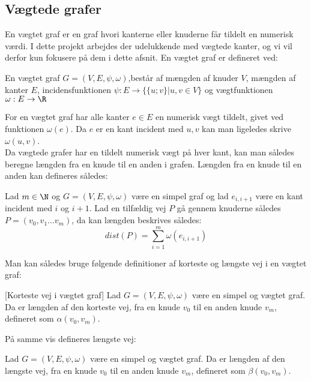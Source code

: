 \subsection{Vægtede grafer}
En vægtet graf er en graf hvori kanterne eller knuderne får tildelt en numerisk værdi. I dette projekt arbejdes der udelukkende med vægtede kanter, og vi vil derfor kun fokusere på dem i dette afsnit.
En vægtet graf er defineret ved:
\begin{defn}
En vægtet graf $G=(V,E,\psi,\omega)$,består af mængden af knuder $V$, mængden af kanter $E$, incidensfunktionen $\psi: E \rightarrow \{\{u;v\}|u,v \in V\}$ og vægtfunktionen $\omega: E \rightarrow \R$
\end{defn}
For en vægtet graf har alle kanter $e\in E$ en numerisk vægt tildelt, givet ved funktionen $\omega (e)$. Da $e$ er en kant incident med ${u,v}$ kan man  ligeledes skrive $\omega (u,v)$.
\\ Da vægtede grafer har en tildelt numerisk vægt på hver kant, kan man således beregne længden fra en knude til en anden i grafen. Længden fra en knude til en anden kan defineres således:

\begin{defn}
Lad $m\in \N$ og $G=(V,E,\psi,\omega)$ være en simpel graf og lad $e_{i,i+1}$ være en kant incident med $i$ og $i+1$. Lad en tilfældig vej $P$ gå gennem knuderne således $P=(v_0,v_1...v_m)$, da kan længden beskrives således:
	\begin{equation*}
	dist(P)=\sum_{i=1}^{m}\omega(e_{i,i+1})
	\end{equation*}  
\end{defn}
Man kan således bruge følgende definitioner af korteste og længste vej i en vægtet graf:


\begin{defn} \label{defn:min.vej} [Korteste vej i vægtet graf]
Lad $G=(V,E,\psi,\omega)$ være en simpel og vægtet graf. Da er længden af den korteste vej, fra en knude $v_0$ til en anden knude $v_m$, defineret som $\alpha(v_0,v_m)$.
\end{defn}

På samme vis defineres længste vej:

\begin{defn} 
Lad $G=(V,E,\psi,\omega)$ være en simpel og vægtet graf. Da er længden af den længste vej, fra en knude $v_0$ til en anden knude $v_m$, defineret som $\beta(v_0,v_m)$.
\end{defn}
